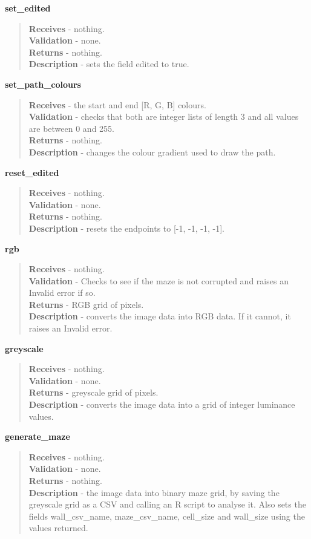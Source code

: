 \documentclass[titlepage]{article}
\begin{document}
\textbf{set\_edited}
\begin{quote}
\textbf{Receives} - nothing.
\\
\textbf{Validation} - none.\\
\textbf{Returns} - nothing.
\\
\textbf{Description} - sets the field edited to true.
\end{quote}

\textbf{set\_path\_colours}
\begin{quote}
\textbf{Receives} - the start and end [R, G, B] colours.\\
\textbf{Validation} - checks that both are integer lists of length 3 and all values are between 0 and 255.\\
\textbf{Returns} - nothing.
\\
\textbf{Description} - changes the colour gradient used to draw the path.
\end{quote}

\textbf{reset\_edited}
\begin{quote}
\textbf{Receives} - nothing.
\\
\textbf{Validation} - none.\\
\textbf{Returns} - nothing.
\\
\textbf{Description} - resets the endpoints to [-1, -1, -1, -1].
\end{quote}

\textbf{rgb}
\begin{quote}
\textbf{Receives} - nothing.
\\
\textbf{Validation} - Checks to see if the maze is not corrupted and raises an Invalid error if so.\\
\textbf{Returns} - RGB grid of pixels.
\\
\textbf{Description} - converts the image data into RGB data. If it cannot, it raises an Invalid error.
\end{quote}

\textbf{greyscale}
\begin{quote}
\textbf{Receives} - nothing.
\\
\textbf{Validation} - none.\\
\textbf{Returns} - greyscale grid of pixels.
\\
\textbf{Description} - converts the image data into a grid of integer luminance values.
\end{quote}

\textbf{generate\_maze}
\begin{quote}
\textbf{Receives} - nothing.
\\
\textbf{Validation} - none.\\
\textbf{Returns} - nothing.
\\
\textbf{Description} - the image data into binary maze grid, by saving the greyscale grid as a CSV and calling an R script to analyse it. Also sets the fields wall\_csv\_name, maze\_csv\_name, cell\_size and wall\_size using the values returned.
\end{quote}
\end{document}
